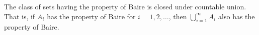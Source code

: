 The class of sets having the property of Baire is closed under countable union. That is, if $A_i$ has the property of Baire for $i = 1, 2, \ldots$, then $\bigcup_{i=1}^{\infty} A_i$ also has the property of Baire.
